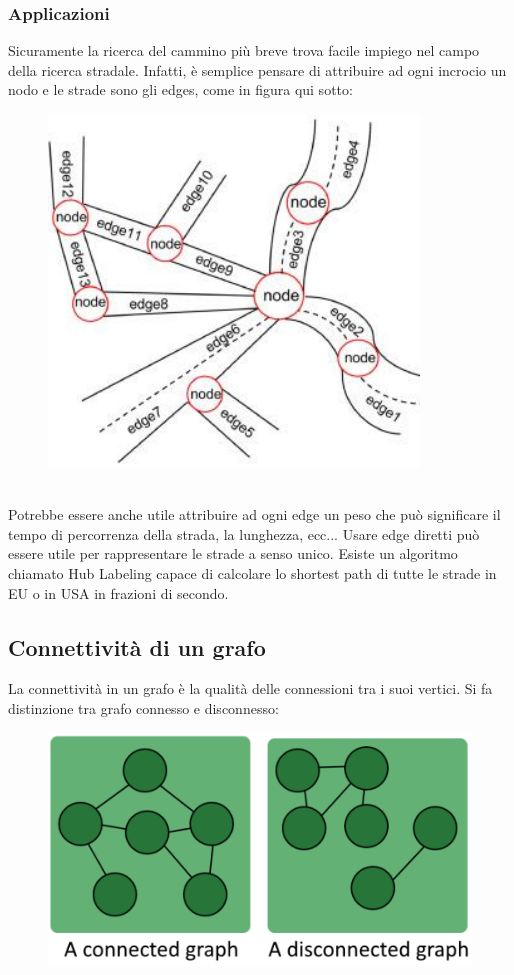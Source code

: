 \subsubsection*{Applicazioni}
Sicuramente la ricerca del cammino più breve trova facile impiego nel campo della ricerca stradale. Infatti, è semplice pensare di attribuire ad ogni incrocio un nodo e le strade sono gli edges, come in figura qui sotto: 
\\
\begin{figure}[th]
    \centering
    \includegraphics[scale=0.4]{Introduction/img/roadmap.png}
    \label{fig:roadmap}
\end{figure}
\\[3ex]
Potrebbe essere anche utile attribuire ad ogni edge un peso che può significare il tempo di percorrenza della strada, la lunghezza, ecc... Usare edge diretti può essere utile per rappresentare le strade a senso unico. Esiste un algoritmo chiamato Hub Labeling capace di calcolare lo shortest path di tutte le strade in EU o in USA in frazioni di secondo. 
\subsection{Connettività di un grafo}
La connettività in un grafo è la qualità delle connessioni tra i suoi vertici. Si fa distinzione tra grafo connesso e disconnesso: 
\\
\begin{figure}[th]
    \centering
    \includegraphics[scale=0.4]{Introduction/img/grafoconnessodisconnesso.png}
    \label{fig:connessodisc}
\end{figure}
